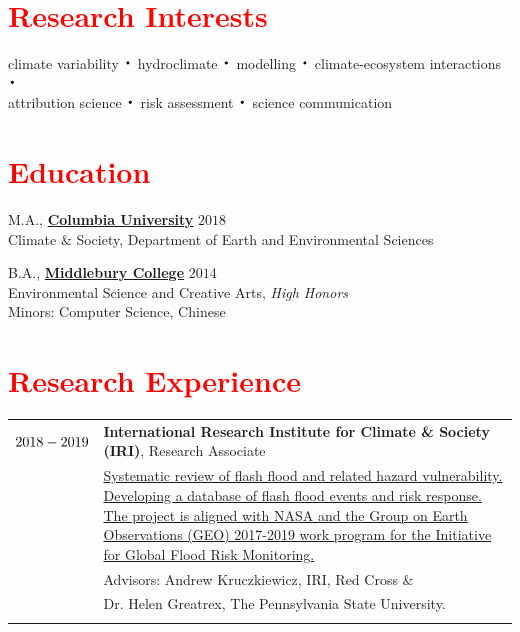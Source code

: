 \documentclass[margin, line]{res}
\newcommand*{\bigDot}{\raisebox{-0.25ex}{\scalebox{2.1}{$\cdot$}}}
\newcommand{\CU}{http://climatesociety.ei.columbia.edu/}
\newcommand{\Midd}{http://www.middlebury.edu/academics/es}
\begin{document}
 



\begin{resume}



\section{\sc \textcolor{Red}{\large{Research Interests}}}
climate variability $\bigDot$  hydroclimate $\bigDot$  modelling $\bigDot$  climate-ecosystem interactions $\bigDot$  \\attribution science $\bigDot$ risk assessment $\bigDot$ science communication  


\vspace{0.15in}
\section{\sc \textcolor{Red}{\large{Education}}}

M.A., {\bf \href{\CU}{Columbia University}}    \hfill {$2018$}
\\
Climate \& Society, Department of Earth and Environmental Sciences
\\
    \vspace*{-.15in} 
  
B.A., {\bf \href{\Midd}{Middlebury College}} \hfill {$2014$}
\\
Environmental Science and Creative Arts, \textit{High Honors} 
\\
    Minors: Computer Science, Chinese
 

\section{\sc \textcolor{Red}{\large{Research Experience}}}
\vspace*{0.05in}
\begin{tabular}{@{}p{1 in}p{4in}}
$\text 2018 - 2019$& \textbf{International Research Institute for Climate \& Society (IRI)},  Research Associate \\
& \href{GEO}{Systematic review of flash flood and related hazard vulnerability.  Developing a database of flash flood events and risk response. The project is aligned with NASA and the Group on Earth Observations (GEO) 2017-2019 work program for the Initiative for Global Flood Risk Monitoring.} \\
& \hspace{0.3in} Advisors: Andrew Kruczkiewicz, IRI, Red Cross \& \\
& \hspace{0.3in} Dr. Helen Greatrex, The Pennsylvania State University. \\ \\


\end{tabular}
\end{resume}
\end{document}
